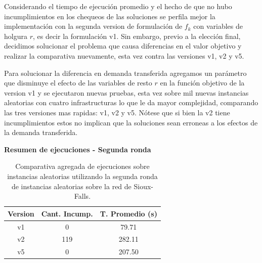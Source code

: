 \documentclass{article}
\begin{document}
  Considerando el tiempo de ejecución promedio y el hecho de que no hubo incumplimientos en los chequeos de las soluciones se perfila mejor la implementación con la segunda version de formulación de $f_k$ con variables de holgura $r$, es decir la formulación v1. Sin embargo, previo a la elección final, decidimos solucionar el problema que causa diferencias en el valor objetivo y realizar la comparativa nuevamente, esta vez contra las versiones v1, v2 y v5.

  Para solucionar la diferencia en demanda transferida agregamos un parámetro que disminuye el efecto de las variables de resto $r$ en la función objetivo de la version v1 y se ejecutaron nuevas pruebas, esta vez sobre mil nuevas instancias aleatorias con cuatro infrastructuras lo que le da mayor complejidad, comparando las tres versiones mas rapidas: v1, v2 y v5. Nótese que si bien la v2 tiene incumplimientos estos no implican que la soluciones sean erroneas a los efectos de la demanda transferida.


  \begin{table}[h!]
    \centering
    \caption*{{\bf Resumen de ejecuciones - Segunda ronda}}
    \begin{tabular}{ccc}
      \toprule
      Version & Cant. Incump. & T. Promedio (s) \\
      \midrule
      v1 & 0   & 79.71   \\
      v2 & 119 & 282.11  \\
      v5 & 0   & 207.50  \\
      \bottomrule
    \end{tabular}
    \caption{Comparativa agregada de ejecuciones sobre instancias aleatorias utilizando la segunda ronda de instancias aleatorias sobre la red de Sioux-Falls.}\label{table:resumenreejecuciones}
  \end{table}
\end{document}
